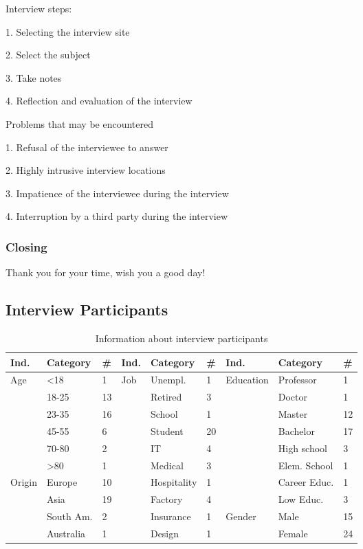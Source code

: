 Interview steps:
\begin{addmargin}[4em]{1em}
1. Selecting the interview site 

2. Select the subject 

3. Take notes

4. Reflection and evaluation of the interview 
\end{addmargin}


Problems that may be encountered 
\begin{addmargin}[4em]{1em}
1. Refusal of the interviewee to answer 

2. Highly intrusive interview locations 

3. Impatience of the interviewee during the interview  

4. Interruption by a third party during the interview 
\end{addmargin}

\subsubsection{Closing}

Thank you for your time, wish you a good day!
 

\subsection{Interview Participants}
\label{interviewees}

\begin{table}[H]
    \centering
\begin{tabular}{ |p{1.2cm}|p{2cm}|p{0.5cm}||p{0.8cm}|p{2cm}|p{0.5cm}||p{2cm}|p{2.5cm}|p{0.5cm}|  }
\hline
    Ind. & Category & \# & Ind. & Category & \# & Ind. & Category & \# \\
\hline
\hline
    \multirow{6}{*}{Age} & <18 & 1 & \multirow{10}{*}{Job} & Unempl. & 1 & \multirow{8}{*}{Education} & Professor & 1 \\
    & 18-25 & 13 & & Retired & 3 & & Doctor & 1 \\
    & 23-35 & 16 & & School & 1 & & Master & 12 \\
    & 45-55 & 6 & & Student & 20 & & Bachelor & 17 \\
    & 70-80 & 2 & & IT & 4 & & High school & 3 \\
    & >80 & 1 & & Medical & 3 & & Elem. School & 1 \\
    \cline{1-3}
    \multirow{4}{*}{Origin} & Europe & 10 & & Hospitality & 1 & & Career Educ. & 1 \\
    & Asia & 19 & & Factory & 4 & & Low Educ. & 3 \\ \cline{7-9}
    & South Am. & 2 & & Insurance & 1 & \multirow{2}{*}{Gender} & Male & 15 \\
    & Australia & 1 & & Design & 1 & & Female & 24 \\
    
\hline

\end{tabular}
\caption{Information about interview participants}
    \label{tab:4}
\end{table}


